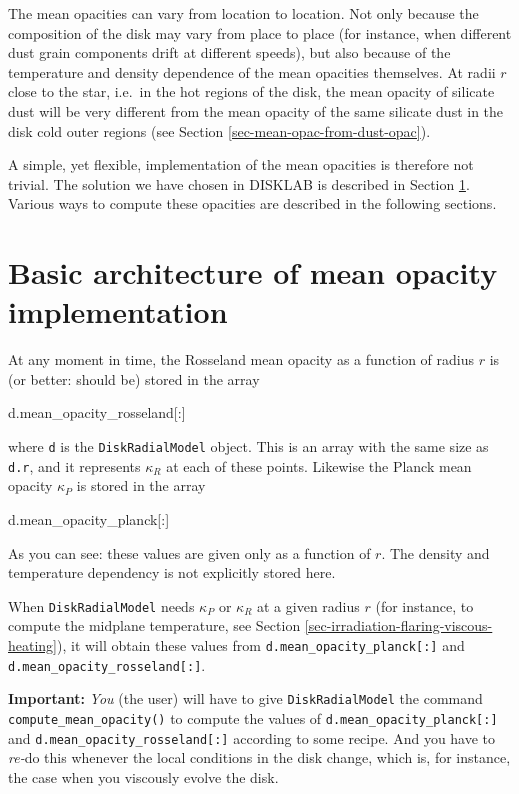 \documentclass{book}
\newcommand{\code}[1]{{\small\tt #1}}
\begin{document}
The mean opacities can vary from location to location. Not only because the
composition of the disk may vary from place to place (for instance, when
different dust grain components drift at different speeds), but also because of
the temperature and density dependence of the mean opacities themselves. At
radii $r$ close to the star, i.e.~in the hot regions of the disk, the mean
opacity of silicate dust will be very different from the mean opacity of the
same silicate dust in the disk cold outer regions (see Section
\ref{sec-mean-opac-from-dust-opac}).

A simple, yet flexible, implementation of the mean opacities is therefore not
trivial. The solution we have chosen in {\sf DISKLAB} is described in
Section \ref{sec-mean-opac-basic-architecture}. Various ways to compute
these opacities are described in the following sections.


\section{Basic architecture of mean opacity implementation}
\label{sec-mean-opac-basic-architecture}
%
At any moment in time, the Rosseland mean opacity as a function of
radius $r$ is (or better: should be) stored in the array
\begin{codebox}
d.mean_opacity_rosseland[:]
\end{codebox}
where \code{d} is the \code{DiskRadialModel} object. This is an array with the same
size as \code{d.r}, and it represents $\kappa_R$ at each of these
points. Likewise the Planck mean opacity $\kappa_P$ is stored in the array
\begin{codebox}
d.mean_opacity_planck[:]
\end{codebox}
As you can see: these values are given only as a function of $r$. The density
and temperature dependency is not explicitly stored here.

When \code{DiskRadialModel} needs $\kappa_P$ or $\kappa_R$ at a given radius $r$ (for
instance, to compute the midplane temperature, see Section
\ref{sec-irradiation-flaring-viscous-heating}), it will obtain these values from
\code{d.mean\_opacity\_planck[:]} and \code{d.mean\_opacity\_rosseland[:]}.

{\bf Important:} {\em You} (the user) will have to give \code{DiskRadialModel} the
command \code{compute\_mean\_opacity()} to compute the values of
\code{d.mean\_opacity\_planck[:]} and \code{d.mean\_opacity\_rosseland[:]}
according to some recipe. And you have to {\em re-}do this whenever the local
conditions in the disk change, which is, for instance, the case when you
viscously evolve the disk.
\end{document}
